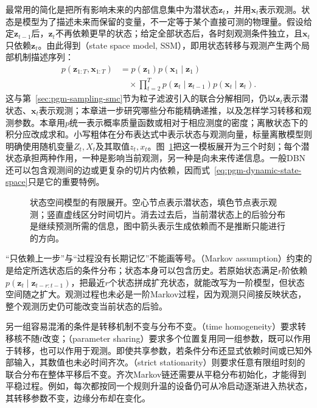最常用的简化是把所有影响未来的内部信息集中为潜状态$\bm{z}_t$，并用$\bm{x}_t$表示观测。状态是模型为了描述未来而保留的变量，不一定等于某个直接可测的物理量。假设给定$\bm{z}_{t-1}$后，$\bm{z}_t$不再依赖更早的状态；给定全部状态后，各时刻观测条件独立，且$\bm{x}_t$只依赖$\bm{z}_t$。由此得到（state space model, SSM），即用状态转移与观测产生两个局部机制描述序列：
\begin{equation}
  \begin{aligned}
    p(\bm{z}_{1:T},\bm{x}_{1:T})
      &=p(\bm{z}_1)p(\bm{x}_1\mid\bm{z}_1)\\
      &\quad{}\times\prod_{t=2}^{T}
        p(\bm{z}_t\mid\bm{z}_{t-1})
        p(\bm{x}_t\mid\bm{z}_t).
  \end{aligned}
  \label{eq:pgm-dynamic-state-space}
\end{equation}
这与第~\ref{sec:pgm-sampling-smc}节为粒子滤波引入的联合分解相同，仍以$\bm{z}_t$表示潜状态、$\bm{x}_t$表示观测；本章进一步研究哪些分布能精确递推，以及怎样学习转移和观测参数。本章用$p$统一表示概率质量函数或相对于相应测度的密度；离散状态下的积分应改成求和。小写粗体在分布表达式中表示状态与观测向量，标量离散模型则明确使用随机变量$Z_t,X_t$及其取值$z_t,x_t$。图~\ref{fig:pgm-dynamic-template}把这一模板展开为三个时刻；每个潜状态承担两种作用，一种是影响当前观测，另一种是向未来传递信息。一般DBN还可以包含观测间的边或更复杂的切片内依赖，因而式~\eqref{eq:pgm-dynamic-state-space}只是它的重要特例。

\begin{figure}[htbp]
  \centering
  
  \caption{状态空间模型的有限展开。空心节点表示潜状态，填色节点表示观测；竖直虚线区分时间切片。消去过去后，当前潜状态上的后验分布是继续预测所需的信息，图中箭头表示生成依赖而不是推断只能进行的方向。}
  \label{fig:pgm-dynamic-template}
\end{figure}

“只依赖上一步”与“过程没有长期记忆”不能画等号。（Markov assumption）约束的是给定所选状态后的条件分布；状态本身可以包含历史。若原始状态满足$r$阶依赖$p(\bm{z}_t\mid\bm{z}_{t-r:t-1})$，把最近$r$个状态拼成扩充状态，就能改写为一阶模型，但状态空间随之扩大。观测过程也未必是一阶Markov过程，因为观测只间接反映状态，整个观测历史仍可能改变当前状态的后验。

另一组容易混淆的条件是转移机制不变与分布不变。（time homogeneity）要求转移核不随$t$改变；（parameter sharing）要求多个位置复用同一组参数，既可以作用于转移，也可以作用于观测。即使共享参数，若条件分布还显式依赖时间或已知外部输入，其数值也未必时间齐次。（strict stationarity）则要求任意有限组时刻的联合分布在整体平移后不变。齐次Markov链还需要从平稳分布初始化，才能得到平稳过程。例如，每次都按同一个规则升温的设备仍可从冷启动逐渐进入热状态，其转移参数不变，边缘分布却在变化。

